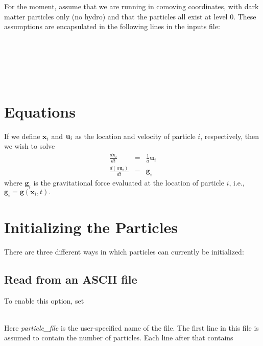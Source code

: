 For the moment, assume that we are running in comoving coordinates, 
with dark matter particles only (no hydro) and that the particles all exist at level 0.   These assumptions are
encapsulated in the following lines in the inputs file: \\

 \\
 \\
 \\
 \\
 \\

\section{Equations}

If we define ${\mathbf x}_i$ and ${\bf u}_i$ as the location and velocity of particle $i$, respectively, then we wish
to solve
\begin{eqnarray}
\frac{d {\mathbf x}_i}{d t} &=& \frac{1}{a} {\mathbf u}_i \\
\frac{d (a {\mathbf u}_i) }{d t} &=& {\mathbf g}_i
\end{eqnarray}
where ${\mathbf g}_i$ is the gravitational force evaluated at the location of particle $i$, i.e., 
${\mathbf g}_i = {\mathbf g}({\mathbf x}_i,t).$

\section{Initializing the Particles}

\noindent There are three different ways in which particles can currently be initialized:

\subsection{Read from an ASCII file}

To enable this option, set \\

 \\

Here {\em particle\_file} is the user-specified name of the file.  The first line in this file is
assumed to contain the number of particles.  Each line after that contains  \\

